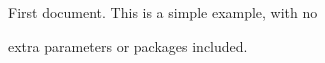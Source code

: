 \documentclass{article}
\begin{document}
First document. This is a simple example, with no

extra parameters or packages included.
\end{document}
